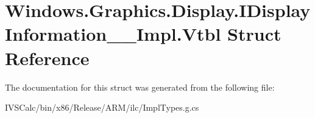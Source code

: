 \hypertarget{struct_windows_1_1_graphics_1_1_display_1_1_i_display_information_____impl_1_1_vtbl}{}\section{Windows.\+Graphics.\+Display.\+I\+Display\+Information\+\_\+\+\_\+\+Impl.\+Vtbl Struct Reference}
\label{struct_windows_1_1_graphics_1_1_display_1_1_i_display_information_____impl_1_1_vtbl}


The documentation for this struct was generated from the following file\+:\begin{DoxyCompactItemize}
\item 
I\+V\+S\+Calc/bin/x86/\+Release/\+A\+R\+M/ilc/Impl\+Types.\+g.\+cs\end{DoxyCompactItemize}
